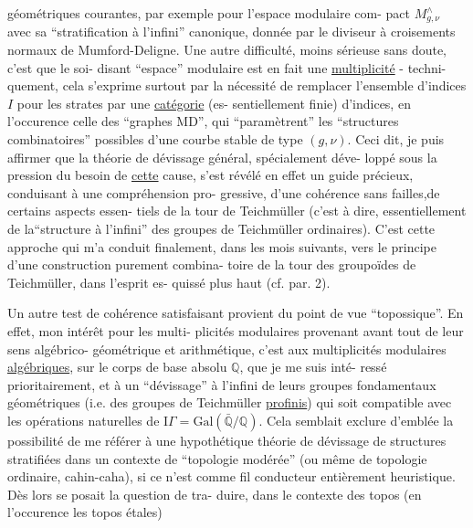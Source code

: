 
géométriques courantes, par exemple pour l'espace modulaire com-%
pact $M^{\wedge}_{g,\nu}$ avec sa ``stratification à l'infini'' canonique, donnée
par le diviseur à croisements normaux de Mumford-Deligne. Une
autre difficulté, moins sérieuse sans doute, c'est que le soi-%
disant ``espace'' modulaire est en fait une \uline{multiplicité} - techni-%
quement, cela s'exprime surtout par la nécessité de remplacer
l'ensemble d'indices $I$ pour les strates par une \uline{catégorie} (es-%
sentiellement finie) d'indices, en l'occurence celle des
``graphes MD'', qui ``paramètrent'' les ``structures combinatoires''
possibles d'une courbe stable de type $(g,\nu)$. Ceci dit, je puis
affirmer que la théorie de dévissage général, spécialement déve-%
loppé sous la pression du besoin de \uline{cette} cause, s'est révélé
en effet un guide précieux, conduisant à une compréhension pro-%
gressive, d'une cohérence sans failles,de certains aspects essen-%
tiels de la tour de Teichmüller (c'est à dire, essentiellement
de la``structure à l'infini'' des groupes de Teichmüller ordinaires).
C'est cette approche qui m'a conduit finalement, dans les mois
suivants, vers le principe d'une construction purement combina-%
toire de la tour des groupoïdes de Teichmüller, dans l'esprit es-%
quissé plus haut (cf. par. 2).

Un autre test de cohérence satisfaisant provient du
point de vue ``topossique''. En effet, mon intérêt pour les multi-%
plicités modulaires provenant avant tout de leur sens algébrico-%
géométrique et arithmétique, c'est aux multiplicités modulaires
\uline{algébriques}, sur le corps de base absolu $\mathbb{Q}$, que je me suis inté-%
ressé prioritairement, et à un ``dévissage'' à l'infini de leurs
groupes fondamentaux géométriques (i.e. des groupes de Teichmüller
\uline{profinis}) qui soit compatible avec les opérations naturelles de
$\mathrm{I}\!\Gamma = \mathrm{Gal}(\bar{\mathbb{Q}}/\mathbb{Q})$. Cela semblait exclure d'emblée la possibilité de me
référer à une hypothétique théorie de dévissage de structures
stratifiées dans un contexte de ``topologie modérée'' (ou même de
topologie ordinaire, cahin-caha), si ce n'est comme fil conducteur
entièrement heuristique. Dès lors se posait la question de tra-%
duire, dans le contexte des topos (en l'occurence les topos étales)

